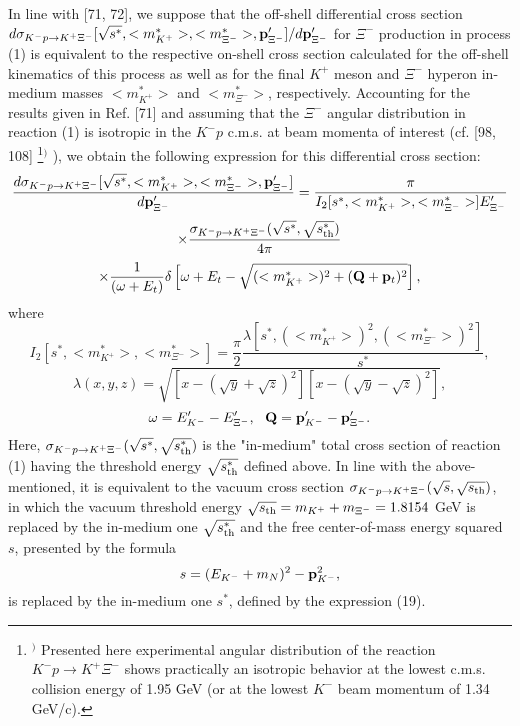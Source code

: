 \documentclass[12pt]{article}
\begin{document}
   In line with [71, 72], we suppose that the off-shell differential cross section
$d\sigma_{{K^-}p \to {K^+}{\Xi^-}}[\sqrt{s^*},<m_{K^+}^*>,<m_{\Xi^-}^*>,{\bf p}^{\prime}_{\Xi^-}]
/d{\bf p}^{\prime}_{\Xi^-}$ for $\Xi^-$ production in process (1) is equivalent to
the respective on-shell cross section calculated for the off-shell kinematics of this process
as well as for the final $K^+$ meson and $\Xi^-$ hyperon in-medium masses $<m_{K^+}^*>$
and $<m_{\Xi^-}^*>$, respectively. Accounting for the results given in Ref. [71] and assuming that the
$\Xi^-$ angular distribution in reaction (1) is isotropic in the ${K^-}p$ c.m.s. at beam momenta
of interest (cf. [98, 108]
\footnote{$^)$ Presented here experimental angular distribution of the reaction $K^-p \to K^+\Xi^-$
shows practically an isotropic behavior at the lowest c.m.s. collision energy of 1.95 GeV (or at the
lowest $K^-$ beam momentum of 1.34 GeV/c).}$^)$
),
we obtain the following expression for this differential cross section:
\begin{equation}
\frac{d\sigma_{K^{-}p \to {K^+}{\Xi^-}}[\sqrt{s^*},<m_{K^+}^*>,<m_{\Xi^-}^*>,{\bf p}^{\prime}_{\Xi^-}]}
{d{\bf p}^{\prime}_{\Xi^-}}=
\frac{\pi}{I_2[s^*,<m_{K^+}^*>,<m_{\Xi^-}^*>]E^{\prime}_{\Xi^-}}
\end{equation}
$$
\times
\frac{\sigma_{{K^{-}}p \to {K^+}{\Xi^-}}(\sqrt{s^*},\sqrt{s^*_{\rm th}})}{4\pi}
$$
$$
\times
\frac{1}{(\omega+E_t)}\delta\left[\omega+E_t-\sqrt{(<m_{K^+}^*>)^2+({\bf Q}+{\bf p}_t)^2}\right],
$$
where
\begin{equation}
I_2[s^*,<m_{K^+}^*>,<m_{\Xi^-}^*>]=\frac{\pi}{2}
\frac{\lambda[s^*,(<m_{K^+}^*>)^{2},(<m_{\Xi^-}^*>)^{2}]}{s^*},
\end{equation}
\begin{equation}
\lambda(x,y,z)=\sqrt{{\left[x-({\sqrt{y}}+{\sqrt{z}})^2\right]}{\left[x-
({\sqrt{y}}-{\sqrt{z}})^2\right]}},
\end{equation}
\begin{equation}
\omega=E^{\prime}_{K^-}-E^{\prime}_{\Xi^-}, \,\,\,\,{\bf Q}={\bf p}^{\prime}_{K^-}-{\bf p}^{\prime}_{\Xi^-}.
\end{equation}
Here, $\sigma_{{K^{-}}p \to {K^+}{\Xi^-}}(\sqrt{s^*},\sqrt{s^*_{\rm th}})$ is the
"in-medium" total cross section of reaction (1) having the threshold energy $\sqrt{s^*_{\rm th}}$ defined above.
In line with the above-mentioned, it is equivalent to the vacuum cross section
$\sigma_{{K^{-}}p \to {K^+}{\Xi^-}}(\sqrt{s},\sqrt{s_{\rm th}})$, in which the vacuum threshold energy
$\sqrt{s_{\rm th}}=m_{K^+}+m_{\Xi^-}=1.8154$ GeV is replaced by the in-medium one $\sqrt{s^*_{\rm th}}$
and the free center-of-mass energy squared $s$, presented by the formula
\begin{equation}
s=(E_{K^-}+m_N)^2-{\bf p}_{K^-}^2,
\end{equation}
is replaced by the in-medium one $s^*$, defined by the expression (19).
\end{document}

